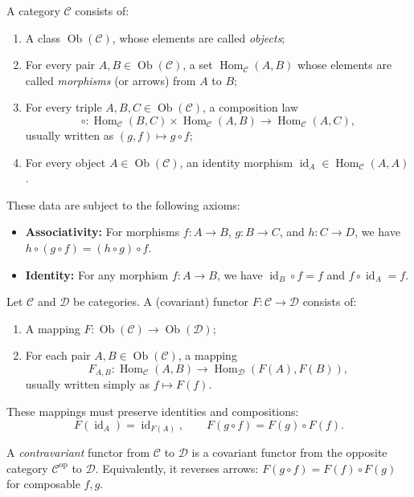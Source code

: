 \begin{defn}
A category $\mathcal{C}$ consists of:
\begin{enumerate}
    \item A class $\operatorname{Ob}(\mathcal{C})$, whose elements are called \emph{objects};
    \item For every pair $A, B \in \operatorname{Ob}(\mathcal{C})$, a set $\operatorname{Hom}_{\mathcal{C}}(A, B)$ whose elements are called \emph{morphisms} (or arrows) from $A$ to $B$;
    \item For every triple $A, B, C \in \operatorname{Ob}(\mathcal{C})$, a composition law
    \[
    \circ: \operatorname{Hom}_{\mathcal{C}}(B, C) \times \operatorname{Hom}_{\mathcal{C}}(A, B) \longrightarrow \operatorname{Hom}_{\mathcal{C}}(A, C),
    \]
    usually written as $(g, f) \mapsto g \circ f$;
    \item For every object $A \in \operatorname{Ob}(\mathcal{C})$, an identity morphism $\operatorname{id}_A \in \operatorname{Hom}_{\mathcal{C}}(A, A)$.
\end{enumerate}
These data are subject to the following axioms:
\begin{itemize}
    \item \textbf{Associativity:} For morphisms $f: A \to B$, $g: B \to C$, and $h: C \to D$, we have $h \circ (g \circ f) = (h \circ g) \circ f$.
    \item \textbf{Identity:} For any morphism $f: A \to B$, we have $\operatorname{id}_B \circ f = f$ and $f \circ \operatorname{id}_A = f$.
\end{itemize}
\end{defn}

\begin{defn}
Let $\mathcal{C}$ and $\mathcal{D}$ be categories. A (covariant) functor $F: \mathcal{C} \to \mathcal{D}$ consists of:
\begin{enumerate}
    \item A mapping $F: \operatorname{Ob}(\mathcal{C}) \to \operatorname{Ob}(\mathcal{D})$;
    \item For each pair $A, B \in \operatorname{Ob}(\mathcal{C})$, a mapping
    \[
    F_{A,B}: \operatorname{Hom}_{\mathcal{C}}(A, B) \longrightarrow \operatorname{Hom}_{\mathcal{D}}(F(A), F(B)),
    \]
    usually written simply as $f \mapsto F(f)$.
\end{enumerate}
These mappings must preserve identities and compositions:
\[
F(\operatorname{id}_A) = \operatorname{id}_{F(A)}, \qquad F(g \circ f) = F(g) \circ F(f).
\]

A \emph{contravariant} functor from $\mathcal{C}$ to $\mathcal{D}$ is a covariant functor from the opposite category $\mathcal{C}^{\mathrm{op}}$ to $\mathcal{D}$. Equivalently, it reverses arrows: $F(g \circ f) = F(f) \circ F(g)$ for composable $f, g$.
\end{defn}

